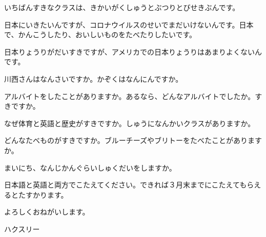 \documentclass[letterpaper]{article}
\begin{document}
いちばんすきなクラスは、きかいがくしゅうとぶつりとびせきぶんです。

日本にいきたいんですが、コロナウイルスのせいでまだいけないんです。日本で、かんこうしたり、おいしいものをたべたりしたいです。

日本りょうりがだいすきですが、アメリカでの日本りょうりはあまりよくないんです。

川西さんはなんさいですか。かぞくはなんにんですか。

アルバイトをしたことがありますか。あるなら、どんなアルバイトでしたか。すきですか。

なぜ体育と英語と歴史がすきですか。しゅうになんかいクラスがありますか。

どんなたべものがすきですか。ブルーチーズやブリトーをたべたことがありますか。

まいにち、なんじかんぐらいしゅくだいをしますか。

日本語と英語と両方でこたえてください。できれば３月末までにこたえてもらえるとたすかります。

よろしくおねがいします。

ハクスリー
\end{document}
